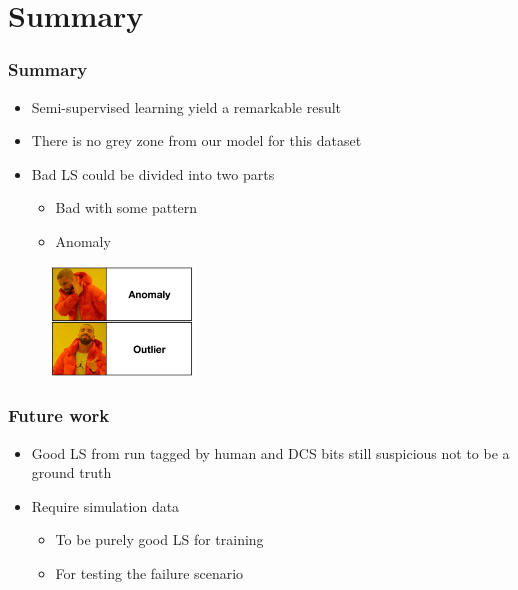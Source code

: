 \documentclass{beamer}
\begin{document}
\section{Summary} %
\begin{frame}
\frametitle{Summary}
\begin{itemize}
    \item Semi-supervised learning yield a remarkable result
    \item There is no grey zone from our model for this dataset
    \item Bad LS could be divided into two parts
    \begin{itemize}
        \item Bad with some pattern
        \item Anomaly
    \end{itemize}
\end{itemize}
\begin{figure}
    \includegraphics[height=0.4\textheight, width=0.35\textwidth]{images/meme_outlier}
\end{figure}
\end{frame}
\begin{frame}
\frametitle{Future work}
\begin{itemize}
    \item Good LS from run tagged by human and DCS bits still suspicious not to be a ground truth
    \item Require simulation data
    \begin{itemize}
        \item To be purely good LS for training
        \item For testing the failure scenario
    \end{itemize}
\end{itemize}
\end{frame}
\end{document}
